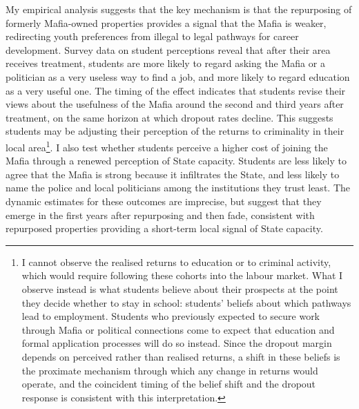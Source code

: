 \documentclass[12pt]{article}
\theoremstyle{plain}
\theoremstyle{plain}
\theoremstyle{plain}
\theoremstyle{definition}
\theoremstyle{plain}
\theoremstyle{definition}
\theoremstyle{plain}
\theoremstyle{remark}
\theoremstyle{definition}
\theoremstyle{definition}
\theoremstyle{plain}
\begin{document}
\medskip
My empirical analysis suggests that the key mechanism is that the repurposing of formerly Mafia-owned properties provides a signal that the Mafia is weaker, redirecting youth preferences from illegal to legal pathways for career development. Survey data on student perceptions reveal that after their area receives treatment, students are more likely to regard asking the Mafia or a politician as a very useless way to find a job, and more likely to regard education as a very useful one.
The timing of the effect indicates that students revise their views about the usefulness of the Mafia around the second and third years after treatment, on the same horizon at which dropout rates decline. This suggests students may be adjusting their perception of the returns to criminality in their local area\footnote{I cannot observe the realised returns to education or to criminal activity, which would require following these cohorts into the labour market. What I observe instead is what students believe about their prospects at the point they decide whether to stay in school: students' beliefs about which pathways lead to employment. Students who previously expected to secure work through Mafia or political connections come to expect that education and formal application processes will do so instead. Since the dropout margin depends on perceived rather than realised returns, a shift in these beliefs is the proximate mechanism through which any change in returns would operate, and the coincident timing of the belief shift and the dropout response is consistent with this interpretation.}. 
I also test whether students perceive a higher cost of joining the Mafia through a renewed perception of State capacity. Students are less likely to agree that the Mafia is strong because it infiltrates the State, and less likely to name the police and local politicians among the institutions they trust least. The dynamic estimates for these outcomes are imprecise, but suggest that they emerge in the first years after repurposing and then fade, consistent with repurposed properties providing a short-term local signal of State capacity. \\
\end{document}
